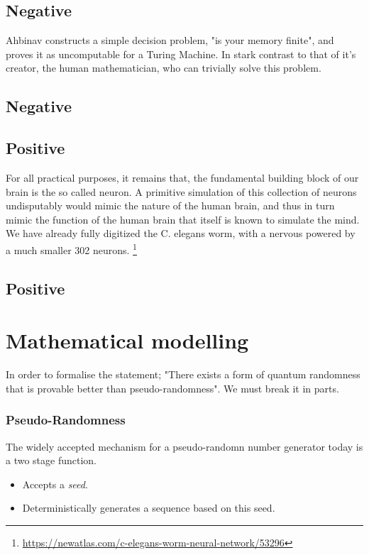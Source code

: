 \documentclass{article}
\begin{document}
\subsection*{Negative}
Ahbinav constructs a simple decision problem, "is your memory finite", and proves it as uncomputable for a Turing Machine. In stark contrast to that of it's creator, the human mathematician, who can trivially solve this problem.

\subsection*{Negative}

\subsection*{Positive}
For all practical purposes, it remains that, the fundamental building block of our brain is the so called neuron. A primitive simulation of this collection of neurons undisputably would mimic the nature of the human brain, and thus in turn mimic the function of the human brain that itself is known to simulate the mind. We have already fully digitized the C. elegans worm, with a nervous powered by a much smaller 302 neurons. \footnote{\url{https://newatlas.com/c-elegans-worm-neural-network/53296}}

\subsection*{Positive}

\pagebreak
\section*{Mathematical modelling}
In order to formalise the statement; "There exists a form of quantum randomness that is provable better than pseudo-randomness". We must break it in parts.

\subsubsection*{Pseudo-Randomness}
The widely accepted mechanism for a pseudo-randomn number generator today is a two stage function.

\begin{itemize}
	\item{Accepts a \emph{seed}.}
	\item{Deterministically generates a sequence based on this seed.}
\end{itemize}
\end{document}

